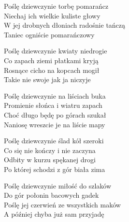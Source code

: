 \begin{text}
    Poślę dziewczynie torbę pomarańcz\\
    Niechaj ich wielkie kuliste głowy\\
    W jej drobnych dłoniach radośnie tańczą\\
    Taniec ogniście pomarańczowy

    Poślę dziewczynie kwiaty niedrogie\\
    Co zapach ziemi płatkami kryją\\
    Rosnące cicho na kopcach mogił\\
    Takie nie swoje jak ja niczyje

    Poślę dziewczynie na liściach buka\\
    Promienie słońca i wiatru zapach\\
    Choć długo będę po górach szukał\\
    Naniosę wreszcie je na liście mapy

    Poślę dziewczynie ślad kół szeroki\\
    Co się nie kończy i nie zaczyna\\
    Odbity w kurzu spękanej drogi\\
    Po której schodzi z gór biała zima

    Poślę dziewczynie miłość do szlaków\\
    Do gór połonin bacowych gadek\\
    Poślę jej czerwień ze wszystkich maków\\
    A później chyba już sam przyjadę
\end{text}
\begin{chord}

\end{chord}
